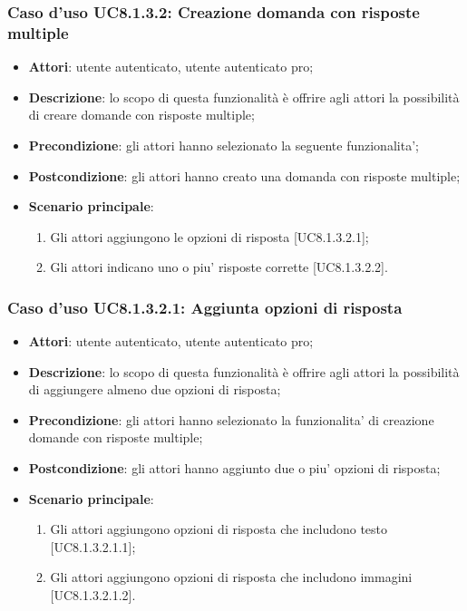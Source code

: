 \subsubsection{Caso d'uso UC8.1.3.2: Creazione domanda con risposte multiple}
	\begin{itemize}
		\item
			\textbf{Attori}: utente autenticato, utente autenticato pro;
		\item		
			\textbf{Descrizione}: lo scopo di questa funzionalità è offrire agli attori la possibilità di creare domande con risposte multiple;
		\item
			\textbf{Precondizione}: gli attori hanno selezionato la seguente funzionalita'; 
		\item
			\textbf{Postcondizione}: gli attori hanno creato una domanda con risposte multiple;
		\item
			\textbf{Scenario principale}:
	       		\begin{enumerate}
	       			\item
	       			Gli attori aggiungono le opzioni di risposta [UC8.1.3.2.1];
					\item
					Gli attori indicano uno o piu' risposte corrette [UC8.1.3.2.2].
	 			\end{enumerate}
	\end{itemize}
	
\subsubsection{Caso d'uso UC8.1.3.2.1: Aggiunta opzioni di risposta}
	\begin{itemize}
		\item
			\textbf{Attori}: utente autenticato, utente autenticato pro;
		\item		
			\textbf{Descrizione}: lo scopo di questa funzionalità è offrire agli attori la possibilità di aggiungere almeno due opzioni di risposta;
		\item
			\textbf{Precondizione}: gli attori hanno selezionato la funzionalita' di creazione domande con risposte multiple; 
		\item
			\textbf{Postcondizione}: gli attori hanno aggiunto due o piu' opzioni di risposta;
		\item
			\textbf{Scenario principale}:
	       		\begin{enumerate}
	       			\item
	       			Gli attori aggiungono opzioni di risposta che includono testo [UC8.1.3.2.1.1];
					\item
					Gli attori aggiungono opzioni di risposta che includono immagini  [UC8.1.3.2.1.2].
	 			\end{enumerate}
	\end{itemize}	
